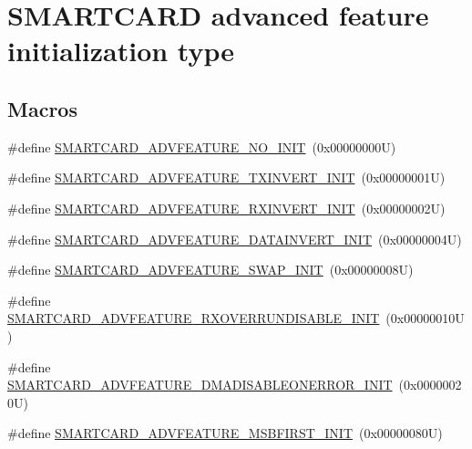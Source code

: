 \hypertarget{group___s_m_a_r_t_c_a_r_d___advanced___features___initialization___type}{}\section{S\+M\+A\+R\+T\+C\+A\+RD advanced feature initialization type}
\label{group___s_m_a_r_t_c_a_r_d___advanced___features___initialization___type}
\subsection*{Macros}
\begin{DoxyCompactItemize}
\item 
\#define \hyperlink{group___s_m_a_r_t_c_a_r_d___advanced___features___initialization___type_ga3f50610506f090ecb288def5c41014ee}{S\+M\+A\+R\+T\+C\+A\+R\+D\+\_\+\+A\+D\+V\+F\+E\+A\+T\+U\+R\+E\+\_\+\+N\+O\+\_\+\+I\+N\+IT}~(0x00000000\+U)
\item 
\#define \hyperlink{group___s_m_a_r_t_c_a_r_d___advanced___features___initialization___type_ga794f7b0774e3154b9f31228f3a33ac49}{S\+M\+A\+R\+T\+C\+A\+R\+D\+\_\+\+A\+D\+V\+F\+E\+A\+T\+U\+R\+E\+\_\+\+T\+X\+I\+N\+V\+E\+R\+T\+\_\+\+I\+N\+IT}~(0x00000001\+U)
\item 
\#define \hyperlink{group___s_m_a_r_t_c_a_r_d___advanced___features___initialization___type_gaa7e8ed8f475a691477e34b716c21237d}{S\+M\+A\+R\+T\+C\+A\+R\+D\+\_\+\+A\+D\+V\+F\+E\+A\+T\+U\+R\+E\+\_\+\+R\+X\+I\+N\+V\+E\+R\+T\+\_\+\+I\+N\+IT}~(0x00000002\+U)
\item 
\#define \hyperlink{group___s_m_a_r_t_c_a_r_d___advanced___features___initialization___type_gaff9179536e899cd05fc0bc073d2de4de}{S\+M\+A\+R\+T\+C\+A\+R\+D\+\_\+\+A\+D\+V\+F\+E\+A\+T\+U\+R\+E\+\_\+\+D\+A\+T\+A\+I\+N\+V\+E\+R\+T\+\_\+\+I\+N\+IT}~(0x00000004\+U)
\item 
\#define \hyperlink{group___s_m_a_r_t_c_a_r_d___advanced___features___initialization___type_ga2b31d5e827e311a620a03d7ac369e3f1}{S\+M\+A\+R\+T\+C\+A\+R\+D\+\_\+\+A\+D\+V\+F\+E\+A\+T\+U\+R\+E\+\_\+\+S\+W\+A\+P\+\_\+\+I\+N\+IT}~(0x00000008\+U)
\item 
\#define \hyperlink{group___s_m_a_r_t_c_a_r_d___advanced___features___initialization___type_gad8481647df6a6e63f98396bcd1077131}{S\+M\+A\+R\+T\+C\+A\+R\+D\+\_\+\+A\+D\+V\+F\+E\+A\+T\+U\+R\+E\+\_\+\+R\+X\+O\+V\+E\+R\+R\+U\+N\+D\+I\+S\+A\+B\+L\+E\+\_\+\+I\+N\+IT}~(0x00000010\+U)
\item 
\#define \hyperlink{group___s_m_a_r_t_c_a_r_d___advanced___features___initialization___type_ga4d119df3c42949a2af040a0dbde5b433}{S\+M\+A\+R\+T\+C\+A\+R\+D\+\_\+\+A\+D\+V\+F\+E\+A\+T\+U\+R\+E\+\_\+\+D\+M\+A\+D\+I\+S\+A\+B\+L\+E\+O\+N\+E\+R\+R\+O\+R\+\_\+\+I\+N\+IT}~(0x00000020\+U)
\item 
\#define \hyperlink{group___s_m_a_r_t_c_a_r_d___advanced___features___initialization___type_ga75b789c3345aa6e8e05494e1f2b2f766}{S\+M\+A\+R\+T\+C\+A\+R\+D\+\_\+\+A\+D\+V\+F\+E\+A\+T\+U\+R\+E\+\_\+\+M\+S\+B\+F\+I\+R\+S\+T\+\_\+\+I\+N\+IT}~(0x00000080\+U)
\end{DoxyCompactItemize}


